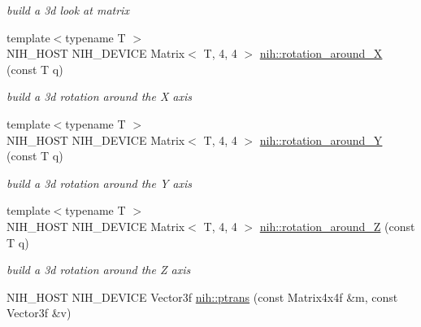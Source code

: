 \begin{DoxyCompactItemize}
\begin{DoxyCompactList}\small\item\em build a 3d look at matrix \end{DoxyCompactList}\item 
\hypertarget{group__matrices_gaf42e47e61afca06aff0efdbb26cfc1ef}{
{\footnotesize template$<$typename T $>$ }\\\-N\-I\-H\-\_\-\-H\-O\-S\-T \-N\-I\-H\-\_\-\-D\-E\-V\-I\-C\-E \-Matrix$<$ \-T, 4, 4 $>$ \hyperlink{group__matrices_gaf42e47e61afca06aff0efdbb26cfc1ef}{nih\-::rotation\-\_\-around\-\_\-\-X} (const \-T q)}
\label{group__matrices_gaf42e47e61afca06aff0efdbb26cfc1ef}

\begin{DoxyCompactList}\small\item\em build a 3d rotation around the \-X axis \end{DoxyCompactList}\item 
\hypertarget{group__matrices_ga21af57144d9398e235230c2096f64655}{
{\footnotesize template$<$typename T $>$ }\\\-N\-I\-H\-\_\-\-H\-O\-S\-T \-N\-I\-H\-\_\-\-D\-E\-V\-I\-C\-E \-Matrix$<$ \-T, 4, 4 $>$ \hyperlink{group__matrices_ga21af57144d9398e235230c2096f64655}{nih\-::rotation\-\_\-around\-\_\-\-Y} (const \-T q)}
\label{group__matrices_ga21af57144d9398e235230c2096f64655}

\begin{DoxyCompactList}\small\item\em build a 3d rotation around the \-Y axis \end{DoxyCompactList}\item 
\hypertarget{group__matrices_gaa52af0191054c50d9ebd145331c61a78}{
{\footnotesize template$<$typename T $>$ }\\\-N\-I\-H\-\_\-\-H\-O\-S\-T \-N\-I\-H\-\_\-\-D\-E\-V\-I\-C\-E \-Matrix$<$ \-T, 4, 4 $>$ \hyperlink{group__matrices_gaa52af0191054c50d9ebd145331c61a78}{nih\-::rotation\-\_\-around\-\_\-\-Z} (const \-T q)}
\label{group__matrices_gaa52af0191054c50d9ebd145331c61a78}

\begin{DoxyCompactList}\small\item\em build a 3d rotation around the \-Z axis \end{DoxyCompactList}\item 
\hypertarget{group__matrices_ga33d8b434a7554e170c48d85be8a45efd}{
\-N\-I\-H\-\_\-\-H\-O\-S\-T \-N\-I\-H\-\_\-\-D\-E\-V\-I\-C\-E \-Vector3f \hyperlink{group__matrices_ga33d8b434a7554e170c48d85be8a45efd}{nih\-::ptrans} (const \-Matrix4x4f \&m, const \-Vector3f \&v)}
\label{group__matrices_ga33d8b434a7554e170c48d85be8a45efd}


\end{DoxyCompactItemize}
